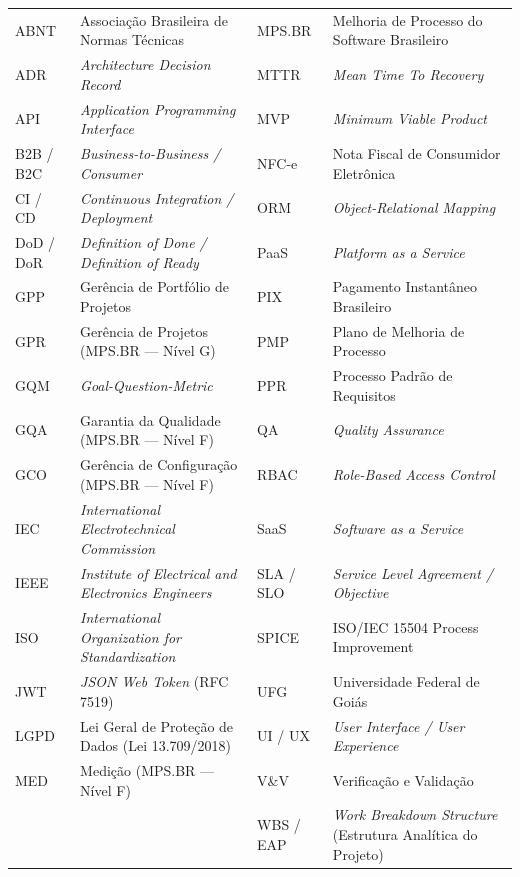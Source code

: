 \noindent
{\fontsize{8.5pt}{12.5pt}\selectfont
\begin{tabularx}{\textwidth}{@{}>{\fontExtraBold\color{BrandNavy}\arraybackslash}m{1.8cm} >{\arraybackslash}m{5.2cm} @{\hspace{0.8cm}} >{\fontExtraBold\color{BrandNavy}\arraybackslash}m{1.8cm} Y@{}}
  ABNT      & Associação Brasileira de Normas Técnicas        & MPS.BR    & Melhoria de Processo do Software Brasileiro \\
  ADR       & \textit{Architecture Decision Record}          & MTTR      & \textit{Mean Time To Recovery} \\
  API       & \textit{Application Programming Interface}     & MVP       & \textit{Minimum Viable Product} \\
  B2B / B2C & \textit{Business-to-Business / Consumer}       & NFC-e     & Nota Fiscal de Consumidor Eletrônica \\
  CI / CD   & \textit{Continuous Integration / Deployment}   & ORM       & \textit{Object-Relational Mapping} \\
  DoD / DoR & \textit{Definition of Done / Definition of Ready} & PaaS   & \textit{Platform as a Service} \\
  GPP       & Gerência de Portfólio de Projetos              & PIX       & Pagamento Instantâneo Brasileiro \\
  GPR       & Gerência de Projetos (MPS.BR — Nível G)        & PMP       & Plano de Melhoria de Processo \\
  GQM       & \textit{Goal-Question-Metric}                   & PPR       & Processo Padrão de Requisitos \\
  GQA       & Garantia da Qualidade (MPS.BR — Nível F)       & QA        & \textit{Quality Assurance} \\
  GCO       & Gerência de Configuração (MPS.BR — Nível F)    & RBAC      & \textit{Role-Based Access Control} \\
  IEC       & \textit{International Electrotechnical Commission} & SaaS  & \textit{Software as a Service} \\
  IEEE      & \textit{Institute of Electrical and Electronics Engineers} & SLA / SLO & \textit{Service Level Agreement / Objective} \\
  ISO       & \textit{International Organization for Standardization} & SPICE & ISO/IEC 15504 Process Improvement \\
  JWT       & \textit{JSON Web Token} (RFC 7519)             & UFG       & Universidade Federal de Goiás \\
  LGPD      & Lei Geral de Proteção de Dados (Lei 13.709/2018) & UI / UX & \textit{User Interface / User Experience} \\
  MED       & Medição (MPS.BR — Nível F)                     & V\&V      & Verificação e Validação \\
            &                                                & WBS / EAP & \textit{Work Breakdown Structure} (Estrutura Analítica do Projeto) \\
\end{tabularx}%
}
\clearpage

\renewcommand{\contentsname}{Sumário}
\tableofcontents
\clearpage
